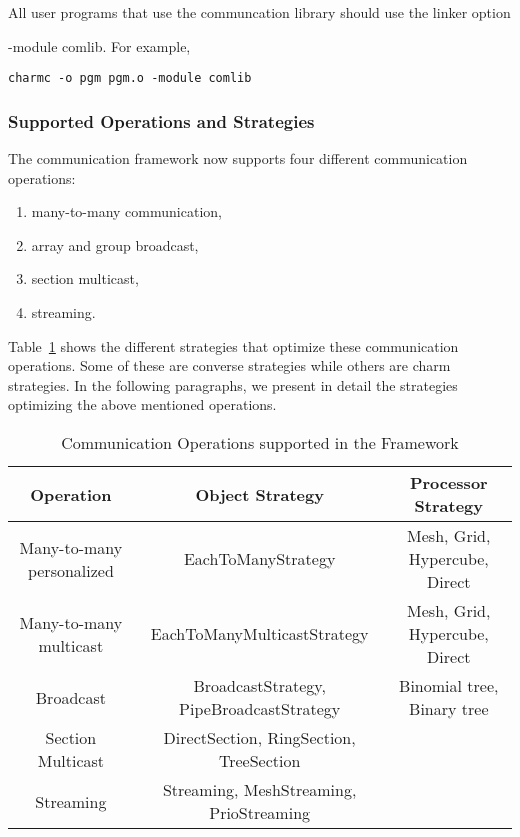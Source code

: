 All user programs that use the communcation library should use the
linker option {\textrm{-module comlib}. For example,
\begin{verbatim}
charmc -o pgm pgm.o -module comlib
\end{verbatim}

\subsubsection{Supported Operations and Strategies}

The communication framework now supports four different communication
operations:
\begin{enumerate}
\item many-to-many communication,
\item array and group broadcast,
\item section multicast,
\item streaming.
\end{enumerate}
Table~\ref{tbl:com_operation} shows the different strategies that optimize these
communication operations. Some of these are converse strategies while others are
charm strategies. In the following paragraphs, we present in detail the
strategies optimizing the above mentioned operations.


\begin{table}[h]
\begin{center}
\begin{small}
\begin{tabular}{|c|c|c|}
\hline
{\bf Operation} & {\bf Object Strategy} & {\bf Processor Strategy} \\
\hline
Many-to-many  personalized & EachToManyStrategy & Mesh, Grid, Hypercube, Direct \\
Many-to-many  multicast    & EachToManyMulticastStrategy & Mesh, Grid, Hypercube, Direct \\
Broadcast  & BroadcastStrategy, PipeBroadcastStrategy & Binomial tree, Binary tree\\
Section Multicast & DirectSection, RingSection, TreeSection & \\
Streaming  & Streaming, MeshStreaming, PrioStreaming & \\
\hline
\end{tabular}
\end{small}
\end{center}
\caption{Communication Operations supported in the Framework}
\label{tbl:com_operation}
\end{table}

}
